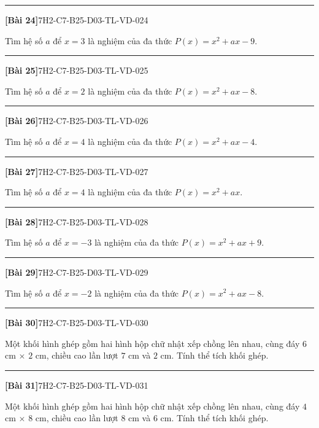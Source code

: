 \documentclass[12pt,a4paper]{article}
\newif\ifloigiai
\newenvironment{cauhoi}[2]{%
  \par\medskip\noindent\rule{\textwidth}{0.4pt}\par\nopagebreak
  \noindent\textbf{[#1]}\hfill{\scriptsize\ttfamily #2}\par\nopagebreak\smallskip}{\par}
\newcommand{\loigiai}[1]{\ifloigiai\par\smallskip\noindent\textit{Lời giải.} #1\par\fi}
\begin{document}
\begin{cauhoi}{Bài 24}{7H2-C7-B25-D03-TL-VD-024}
Tìm hệ số $a$ để $x=3$ là nghiệm của đa thức $P(x)=x^{2}+ax-9$.
\loigiai{$x=3$ là nghiệm nên $P(3)=0$: $9+3\cdot a-9=0$ nên $3a=0$, suy ra $a=0$.}
\end{cauhoi}
\begin{cauhoi}{Bài 25}{7H2-C7-B25-D03-TL-VD-025}
Tìm hệ số $a$ để $x=2$ là nghiệm của đa thức $P(x)=x^{2}+ax-8$.
\loigiai{$x=2$ là nghiệm nên $P(2)=0$: $4+2\cdot a-8=0$ nên $2a=4$, suy ra $a=2$.}
\end{cauhoi}
\begin{cauhoi}{Bài 26}{7H2-C7-B25-D03-TL-VD-026}
Tìm hệ số $a$ để $x=4$ là nghiệm của đa thức $P(x)=x^{2}+ax-4$.
\loigiai{$x=4$ là nghiệm nên $P(4)=0$: $16+4\cdot a-4=0$ nên $4a=-12$, suy ra $a=-3$.}
\end{cauhoi}
\begin{cauhoi}{Bài 27}{7H2-C7-B25-D03-TL-VD-027}
Tìm hệ số $a$ để $x=4$ là nghiệm của đa thức $P(x)=x^{2}+ax$.
\loigiai{$x=4$ là nghiệm nên $P(4)=0$: $16+4\cdot a=0$ nên $4a=-16$, suy ra $a=-4$.}
\end{cauhoi}
\begin{cauhoi}{Bài 28}{7H2-C7-B25-D03-TL-VD-028}
Tìm hệ số $a$ để $x=-3$ là nghiệm của đa thức $P(x)=x^{2}+ax+9$.
\loigiai{$x=-3$ là nghiệm nên $P(-3)=0$: $9-3\cdot a+9=0$ nên $-3a=-18$, suy ra $a=6$.}
\end{cauhoi}
\begin{cauhoi}{Bài 29}{7H2-C7-B25-D03-TL-VD-029}
Tìm hệ số $a$ để $x=-2$ là nghiệm của đa thức $P(x)=x^{2}+ax-8$.
\loigiai{$x=-2$ là nghiệm nên $P(-2)=0$: $4-2\cdot a-8=0$ nên $-2a=4$, suy ra $a=-2$.}
\end{cauhoi}
\begin{cauhoi}{Bài 30}{7H2-C7-B25-D03-TL-VD-030}
Một khối hình ghép gồm hai hình hộp chữ nhật xếp chồng lên nhau, cùng đáy $6$ cm $\times$ $2$ cm, chiều cao lần lượt $7$ cm và $2$ cm. Tính thể tích khối ghép.
\loigiai{Thể tích hai khối là $6\cdot 2\cdot 7=84$ và $6\cdot 2\cdot 2=24$ ($\text{cm}^3$). Thể tích khối ghép là $84+24=108$ ($\text{cm}^3$).}
\end{cauhoi}
\begin{cauhoi}{Bài 31}{7H2-C7-B25-D03-TL-VD-031}
Một khối hình ghép gồm hai hình hộp chữ nhật xếp chồng lên nhau, cùng đáy $4$ cm $\times$ $8$ cm, chiều cao lần lượt $8$ cm và $6$ cm. Tính thể tích khối ghép.
\loigiai{Thể tích hai khối là $4\cdot 8\cdot 8=256$ và $4\cdot 8\cdot 6=192$ ($\text{cm}^3$). Thể tích khối ghép là $256+192=448$ ($\text{cm}^3$).}
\end{cauhoi}
\end{document}
